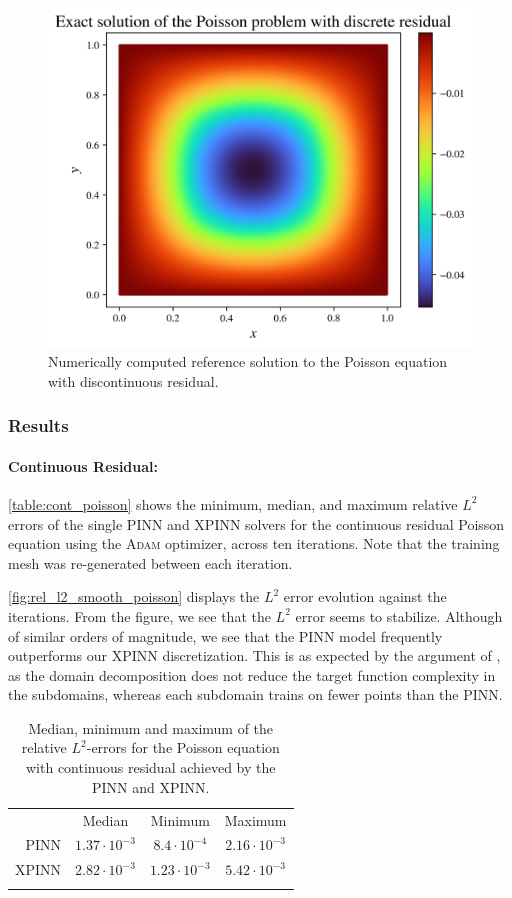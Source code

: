 \begin{figure}[h]
    \centering
    \includegraphics[width = 0.7\linewidth]{Project1XPINNs/figures/Poisson/discrete_Poisson_solution.png}
    \caption{Numerically computed reference solution to the Poisson equation with discontinuous residual.}
    \label{fig:exact_discontinuous}
\end{figure}

\subsubsection{Results}
\paragraph{Continuous Residual:}
\autoref{table:cont_poisson} shows the minimum, median, and maximum relative $L^2$ errors of the single PINN and XPINN solvers for the continuous residual Poisson equation using the \textsc{Adam} optimizer, across ten iterations.
Note that the training mesh was re-generated between each iteration.


\autoref{fig:rel_l2_smooth_poisson} displays the $L^2$ error evolution against the iterations.
From the figure, we see that the $L^2$ error seems to stabilize.
Although of similar orders of magnitude, we see that the PINN model frequently outperforms our XPINN discretization.
This is as expected by the argument of \textcite{XPINN_generalize}, as the domain decomposition does not reduce the target function complexity in the subdomains, whereas each subdomain trains on fewer points than the PINN. 

\begin{table}[h]
\caption{Median, minimum and maximum of the relative $L^2$-errors for the Poisson equation with continuous residual achieved by the PINN and XPINN.}
    \centering
    \begin{tabular}{r|c|c|c}\toprule
     & Median & Minimum & Maximum
    \\
    \colrule
    PINN & $1.37\cdot 10^{-3}$ &  $8.4 \cdot 10^{-4}$ & $2.16 \cdot 10^{-3}$ 
    \\
    XPINN & $2.82\cdot 10^{-3} $ &  $1.23 \cdot 10^{-3}$ & $5.42 \cdot 10^{-3}$
    \\
    \botrule
    \end{tabular}
    \label{table:cont_poisson}
\end{table}

